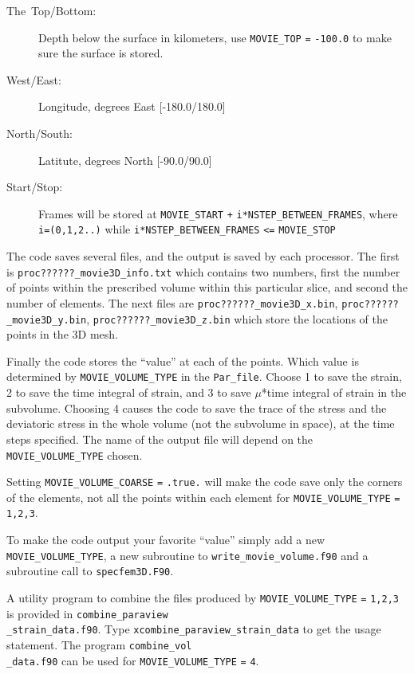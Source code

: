 \documentclass[oneside,english]{book}
\begin{document}
\begin{description}
\item [{The~Top/Bottom:}] Depth below the surface in kilometers, use \texttt{\small MOVIE\_TOP}
\texttt{\small =} \texttt{\small -100.0} to make sure the surface
is stored.
\item [{West/East:}] Longitude, degrees East {[}-180.0/180.0]
\item [{North/South:}] Latitute, degrees North {[}-90.0/90.0]
\item [{Start/Stop:}] Frames will be stored at \texttt{\small MOVIE\_START}
\texttt{\small +} \texttt{\small i{*}NSTEP\_BETWEEN\_FRAMES}, where
\texttt{\small i=(0,1,2..)} while \texttt{\small i{*}NSTEP\_BETWEEN\_FRAMES}
\texttt{\small <=} \texttt{\small MOVIE\_STOP}{\small \par}
\end{description}
The code saves several files, and the output is saved by each processor.
The first is \texttt{\small proc??????\_movie3D\_info.txt} which contains
two numbers, first the number of points within the prescribed volume
within this particular slice, and second the number of elements. The
next files are \texttt{\small proc??????\_movie3D\_x.bin}, \texttt{\small proc??????\_movie3D\_y.bin},
\texttt{\small proc??????\_movie3D\_z.bin} which store the locations
of the points in the 3D mesh.

Finally the code stores the ``value'' at each of the points. Which
value is determined by \texttt{\small MOVIE\_VOLUME\_TYPE} in the
\texttt{\small Par\_file}. Choose 1 to save the strain, 2 to save
the time integral of strain, and 3 to save $\mu${*}time integral
of strain in the subvolume. Choosing 4 causes the code to save the
trace of the stress and the deviatoric stress in the whole volume
(not the subvolume in space), at the time steps specified. The name
of the output file will depend on the \texttt{\small MOVIE\_VOLUME\_TYPE}
chosen.

Setting \texttt{\small MOVIE\_VOLUME\_COARSE} \texttt{\small =} \texttt{\small .true.}
will make the code save only the corners of the elements, not all
the points within each element for \texttt{\small MOVIE\_VOLUME\_TYPE}
\texttt{\small =} \texttt{\small 1,2,3}.

To make the code output your favorite ``value'' simply add a new \texttt{\small MOVIE\_VOLUME\_TYPE},
a new subroutine to \texttt{\small write\_movie\_volume.f90} and a
subroutine call to \texttt{\small specfem3D.F90}.

A utility program to combine the files produced by \texttt{\small MOVIE\_VOLUME\_TYPE}
\texttt{\small =} \texttt{\small 1,2,3} is provided in \texttt{\small combine\_paraview}~\\
\texttt{\small \_strain\_data.f90}. Type \texttt{\small xcombine\_paraview\_strain\_data}
to get the usage statement. The program \texttt{\small combine\_vol}~\\
\texttt{\small \_data.f90} can be used for \texttt{\small MOVIE\_VOLUME\_TYPE}
\texttt{\small =} \texttt{\small 4}.
\end{document}
